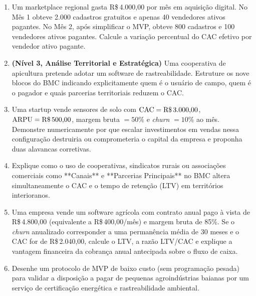 \begin{enumerate}[leftmargin=1.5em, itemsep=6pt]
  \item Um marketplace regional gasta R\$\,4.000,00 por mês em aquisição digital. No Mês 1 obteve 2.000 cadastros gratuitos e apenas 40 vendedores ativos pagantes. No Mês 2, após simplificar o MVP, obteve 800 cadastros e 100 vendedores ativos pagantes. Calcule a variação percentual do CAC efetivo por vendedor ativo pagante.
  \espacoResolucao[2.3cm]

  \item \textbf{(Nível 3, Análise Territorial e Estratégica)} Uma cooperativa de apicultura pretende adotar um software de rastreabilidade. Estruture os nove blocos do BMC indicando explicitamente quem é o usuário de campo, quem é o pagador e quais parcerias territoriais reduzem o CAC.
  \espacoResolucao[2.3cm]

  \item Uma startup vende sensores de solo com $\text{CAC} = \text{R\$\,3.000,00}$, $\text{ARPU} = \text{R\$\,500,00}$, margem bruta $= 50\%$ e \textit{churn} $= 10\%$ ao mês. Demonstre numericamente por que escalar investimentos em vendas nessa configuração destruiria ou comprometeria o capital da empresa e proponha duas alavancas corretivas.
  \espacoResolucao[2.4cm]

  \item Explique como o uso de cooperativas, sindicatos rurais ou associações comerciais como **Canais** e **Parcerias Principais** no BMC altera simultaneamente o CAC e o tempo de retenção (LTV) em territórios interioranos.
  \espacoResolucao[2.2cm]

  \item Uma empresa vende um software agrícola com contrato anual pago à vista de R\$\,4.800,00 (equivalente a R\$\,400,00/mês) e margem bruta de 85\%. Se o \textit{churn} anualizado corresponder a uma permanência média de 30 meses e o CAC for de R\$\,2.040,00, calcule o LTV, a razão LTV/CAC e explique a vantagem financeira da cobrança anual antecipada sobre o fluxo de caixa.
  \espacoResolucao[2.4cm]

  \item Desenhe um protocolo de MVP de baixo custo (sem programação pesada) para validar a disposição a pagar de pequenas agroindústrias baianas por um serviço de certificação energética e rastreabilidade ambiental.
  \espacoResolucao[2.3cm]
\end{enumerate}


